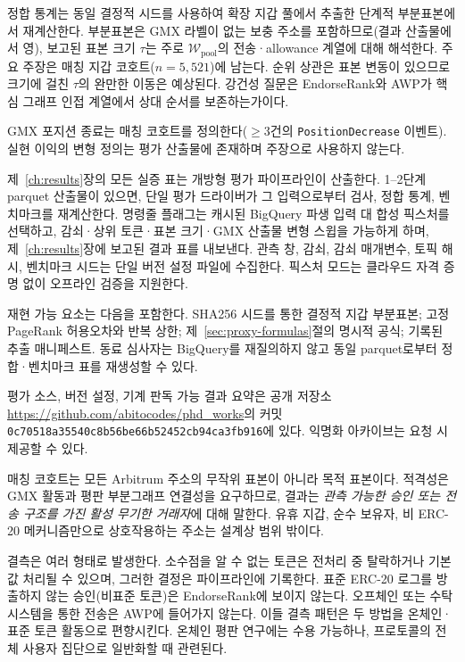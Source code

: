 정합 통계는 동일 결정적 시드를 사용하여 확장 지갑 풀에서 추출한 단계적 부분표본에서 재계산한다. 부분표본은 GMX 라벨이 없는 보충 주소를 포함하므로(결과 산출물에서 영), 보고된 표본 크기 $\tau$는 주로 $\mathcal{W}_{\mathrm{pool}}$의 전송·allowance 계열에 대해 해석한다. 주요 주장은 매칭 지갑 코호트($n=5{,}521$)에 남는다. 순위 상관은 표본 변동이 있으므로 크기에 걸친 $\tau$의 완만한 이동은 예상된다. 강건성 질문은 EndorseRank와 AWP가 핵심 그래프 인접 계열에서 상대 순서를 보존하는가이다.


GMX 포지션 종료는 매칭 코호트를 정의한다($\geq 3$건의 \texttt{PositionDecrease} 이벤트). 실현 이익의 변형 정의는 평가 산출물에 존재하며 주장으로 사용하지 않는다.


제~\ref{ch:results}장의 모든 실증 표는 개방형 평가 파이프라인이 산출한다. 1--2단계 parquet 산출물이 있으면, 단일 평가 드라이버가 그 입력으로부터 검사, 정합 통계, 벤치마크를 재계산한다. 명령줄 플래그는 캐시된 BigQuery 파생 입력 대 합성 픽스처를 선택하고, 감쇠·상위 토큰·표본 크기·GMX 산출물 변형 스윕을 가능하게 하며, 제~\ref{ch:results}장에 보고된 결과 표를 내보낸다. 관측 창, 감쇠, 감쇠 매개변수, 토픽 해시, 벤치마크 시드는 단일 버전 설정 파일에 수집한다. 픽스처 모드는 클라우드 자격 증명 없이 오프라인 검증을 지원한다.

재현 가능 요소는 다음을 포함한다. SHA256 시드를 통한 결정적 지갑 부분표본; 고정 PageRank 허용오차와 반복 상한; 제~\ref{sec:proxy-formulas}절의 명시적 공식; 기록된 추출 매니페스트. 동료 심사자는 BigQuery를 재질의하지 않고 동일 parquet로부터 정합·벤치마크 표를 재생성할 수 있다.

평가 소스, 버전 설정, 기계 판독 가능 결과 요약은 공개 저장소 \url{https://github.com/abitocodes/phd_works}의 커밋 \texttt{0c70518a35540c8b56be66b52452cb94ca3fb916}에 있다. 익명화 아카이브는 요청 시 제공할 수 있다.


매칭 코호트는 모든 Arbitrum 주소의 무작위 표본이 아니라 목적 표본이다. 적격성은 GMX 활동과 평판 부분그래프 연결성을 요구하므로, 결과는 \emph{관측 가능한 승인 또는 전송 구조를 가진 활성 무기한 거래자}에 대해 말한다. 유휴 지갑, 순수 보유자, 비 ERC-20 메커니즘만으로 상호작용하는 주소는 설계상 범위 밖이다.

결측은 여러 형태로 발생한다. 소수점을 알 수 없는 토큰은 전처리 중 탈락하거나 기본값 처리될 수 있으며, 그러한 결정은 파이프라인에 기록한다. 표준 ERC-20 로그를 방출하지 않는 승인(비표준 토큰)은 EndorseRank에 보이지 않는다. 오프체인 또는 수탁 시스템을 통한 전송은 AWP에 들어가지 않는다. 이들 결측 패턴은 두 방법을 온체인·표준 토큰 활동으로 편향시킨다. 온체인 평판 연구에는 수용 가능하나, 프로토콜의 전체 사용자 집단으로 일반화할 때 관련된다.

